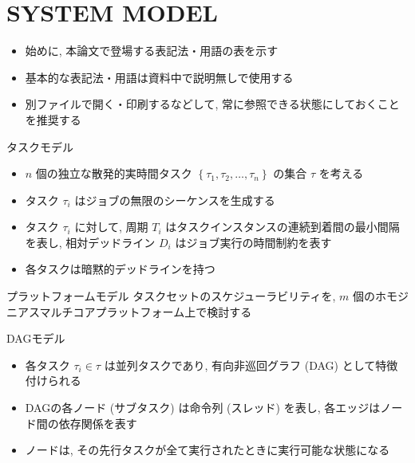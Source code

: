 
\section{SYSTEM MODEL}
\label{sec: system model}

\begin{frame}{}
    \begin{itemize}
        \item 始めに, 本論文で登場する表記法・用語の表を示す
        \item 基本的な表記法・用語は資料中で説明無しで使用する
        \item 別ファイルで開く・印刷するなどして, 常に参照できる状態にしておくことを推奨する
    \end{itemize}
\end{frame}



\begin{frame}{タスクモデル}
    \begin{itemize}
        \item $n$ 個の独立な散発的実時間タスク $\left\{\tau_{1}, \tau_{2}, \ldots, \tau_{n}\right\}$ の集合 $\tau$ を考える
        \item タスク $\tau_{i}$ はジョブの無限のシーケンスを生成する
        \item タスク $\tau_{i}$ に対して, 周期 $T_{i}$ はタスクインスタンスの連続到着間の最小間隔を表し, 相対デッドライン $D_{i}$ はジョブ実行の時間制約を表す
        \item 各タスクは暗黙的デッドラインを持つ
    \end{itemize}
\end{frame}

\begin{frame}{プラットフォームモデル}
    タスクセットのスケジューラビリティを, $m$ 個のホモジニアスマルチコアプラットフォーム上で検討する
\end{frame}

\begin{frame}{DAGモデル}
    \begin{itemize}
        \item 各タスク $\tau_{i} \in \tau$ は並列タスクであり, 有向非巡回グラフ (DAG) として特徴付けられる
        \item DAGの各ノード (サブタスク) は命令列 (スレッド) を表し, 各エッジはノード間の依存関係を表す
        \item ノードは, その先行タスクが全て実行されたときに実行可能な状態になる
    \end{itemize}
\end{frame}

